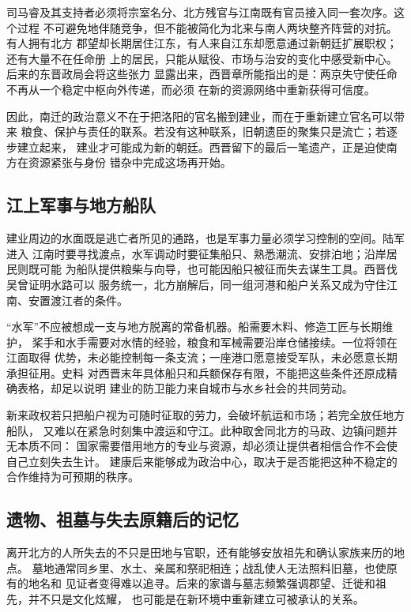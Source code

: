 司马睿及其支持者必须将宗室名分、北方残官与江南既有官员接入同一套次序。这个过程
不可避免地伴随竞争，但不能被简化为北来与南人两块整齐阵营的对抗。有人拥有北方
郡望却长期居住江东，有人来自江东却愿意通过新朝廷扩展职权；还有大量不在任命册
上的居民，只能从赋役、市场与治安的变化中感受新中心。后来的东晋政局会将这些张力
显露出来，西晋章所能指出的是：两京失守使任命不再从一个稳定中枢向外传递，而必须
在新的资源网络中重新获得可信度。

因此，南迁的政治意义不在于把洛阳的官名搬到建业，而在于重新建立官名可以带来
粮食、保护与责任的联系。若没有这种联系，旧朝遗臣的聚集只是流亡；若逐步建立起来，
建业才可能成为新的朝廷。西晋留下的最后一笔遗产，正是迫使南方在资源紧张与身份
错杂中完成这场再开始。

\subsection{江上军事与地方船队}

建业周边的水面既是逃亡者所见的通路，也是军事力量必须学习控制的空间。陆军进入
江南时要寻找渡点，水军调动时要征集船只、熟悉潮流、安排泊地；沿岸居民则既可能
为船队提供粮柴与向导，也可能因船只被征而失去谋生工具。西晋伐吴曾证明水路可以
服务统一，北方崩解后，同一组河港和船户关系又成为守住江南、安置渡江者的条件。

“水军”不应被想成一支与地方脱离的常备机器。船需要木料、修造工匠与长期维护，
桨手和水手需要对水情的经验，粮食和军械需要沿岸仓储接续。一位将领在江面取得
优势，未必能控制每一条支流；一座港口愿意接受军队，未必愿意长期承担征用。史料
对西晋末年具体船只和兵额保存有限，不能把这些条件还原成精确表格，却足以说明
建业的防卫能力来自城市与水乡社会的共同劳动。

新来政权若只把船户视为可随时征取的劳力，会破坏航运和市场；若完全放任地方船队，
又难以在紧急时刻集中渡运和守江。此种取舍同北方的马政、边镇问题并无本质不同：
国家需要借用地方的专业与资源，却必须让提供者相信合作不会使自己立刻失去生计。
建康后来能够成为政治中心，取决于是否能把这种不稳定的合作维持为可预期的秩序。

\subsection{遗物、祖墓与失去原籍后的记忆}

离开北方的人所失去的不只是田地与官职，还有能够安放祖先和确认家族来历的地点。
墓地通常同乡里、水土、亲属和祭祀相连；战乱使人无法照料旧墓，也使原有的地名和
见证者变得难以追寻。后来的家谱与墓志频繁强调郡望、迁徙和祖先，并不只是文化炫耀，
也可能是在新环境中重新建立可被承认的关系。

